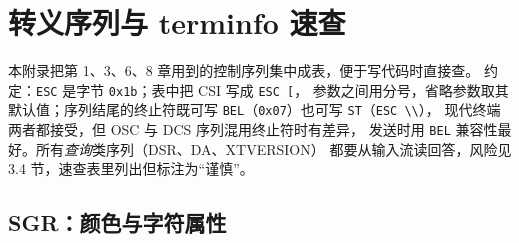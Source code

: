 \documentclass[12pt,a4paper,fontset=fandol]{ctexbook}
\newcommand{\Tp}[1]{\texttt{#1}}
\begin{document}
\appendix

\chapter{转义序列与 terminfo 速查}

本附录把第 1、3、6、8 章用到的控制序列集中成表，便于写代码时直接查。
约定：\Tp{ESC} 是字节 \Tp{0x1b}；表中把 CSI 写成 \Tp{ESC [}，
参数之间用分号，省略参数取其默认值；序列结尾的终止符既可写
\Tp{BEL}（\Tp{0x07}）也可写 \Tp{ST}（\Tp{ESC \textbackslash\textbackslash}），
现代终端两者都接受，但 OSC 与 DCS 序列混用终止符时有差异，
发送时用 \Tp{BEL} 兼容性最好。所有\emph{查询}类序列（DSR、DA、XTVERSION）
都要从输入流读回答，风险见 3.4 节，速查表里列出但标注为``谨慎''。

\section{SGR：颜色与字符属性}
\end{document}
